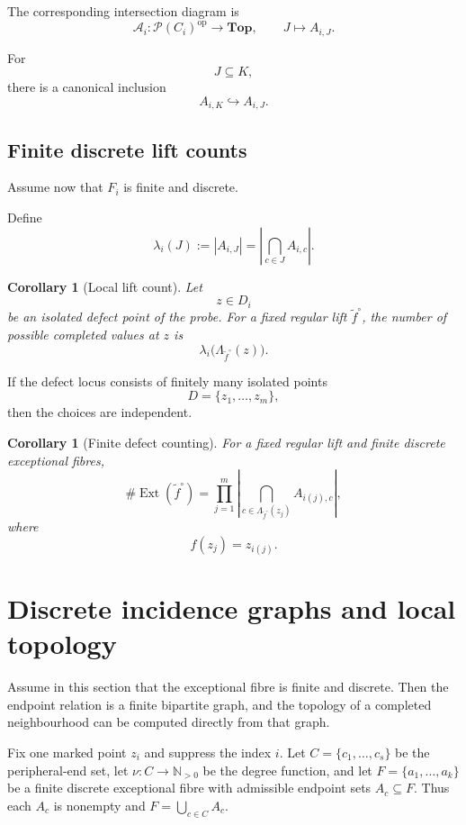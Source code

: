 \documentclass[11pt]{article}
\theoremstyle{plain}
\newtheorem{corollary}[theorem]{Corollary}
\theoremstyle{definition}
\begin{document}
The corresponding intersection diagram is
\[
\mathcal A_i:
\mathcal P(C_i)^{\mathrm{op}}
\longrightarrow
\mathbf{Top},
\qquad
J\longmapsto A_{i,J}.
\]

For
\[
J\subseteq K,
\]
there is a canonical inclusion
\[
A_{i,K}\hookrightarrow A_{i,J}.
\]


\subsection{Finite discrete lift counts}
\label{subsec:discrete-lift-counts}

Assume now that $F_i$ is finite and discrete.

Define
\[
\lambda_i(J)
:=
\left|
A_{i,J}
\right|
=
\left|
\bigcap_{c\in J}A_{i,c}
\right|.
\]

\begin{corollary}[Local lift count]
\label{cor:local-lift-count}
Let
\[
z\in D_i
\]
be an isolated defect point of the probe.  For a fixed regular lift
$\widetilde f^\circ$, the number of possible completed values at $z$ is
\[
\lambda_i
\bigl(
\Lambda_{\widetilde f^\circ}(z)
\bigr).
\]
\end{corollary}

If the defect locus consists of finitely many isolated points
\[
D=\{z_1,\ldots,z_m\},
\]
then the choices are independent.

\begin{corollary}[Finite defect counting]
\label{cor:finite-defect-counting}
For a fixed regular lift and finite discrete exceptional fibres,
\[
\#\operatorname{Ext}(\widetilde f^\circ)
=
\prod_{j=1}^m
\left|
\bigcap_{c\in
\Lambda_{\widetilde f^\circ}(z_j)}
A_{i(j),c}
\right|,
\]
where
\[
f(z_j)=z_{i(j)}.
\]
\end{corollary}




\section{Discrete incidence graphs and local topology}
\label{sec:discrete-incidence-topology}

Assume in this section that the exceptional fibre is finite and discrete.  Then
the endpoint relation is a finite bipartite graph, and the topology of a
completed neighbourhood can be computed directly from that graph.

Fix one marked point $z_i$ and suppress the index $i$.  Let
$C=\{c_1,\ldots,c_s\}$ be the peripheral-end set, let
$\nu:C\to\mathbb N_{>0}$ be the degree function, and let
$F=\{a_1,\ldots,a_k\}$ be a finite discrete exceptional fibre with admissible endpoint
sets $A_c\subseteq F$.  Thus each $A_c$ is nonempty and
$F=\bigcup_{c\in C}A_c$.
\end{document}
